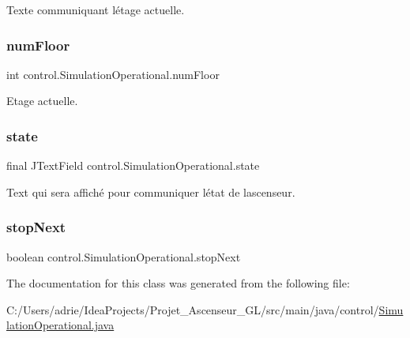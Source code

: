 Texte communiquant l\textquotesingle{}étage actuelle. 

\mbox{\label{classcontrol_1_1_simulation_operational_a8b244e8cd89afb3060e4025c76f3ccc1}} 
\subsubsection{\texorpdfstring{numFloor}{numFloor}}
{\footnotesize\ttfamily int control.\+Simulation\+Operational.\+num\+Floor\hspace{0.3cm}{\ttfamily [private]}}



Etage actuelle. 

\mbox{\label{classcontrol_1_1_simulation_operational_a00a11786ca7a99c8e6ee6b3990300ac6}} 
\subsubsection{\texorpdfstring{state}{state}}
{\footnotesize\ttfamily final J\+Text\+Field control.\+Simulation\+Operational.\+state\hspace{0.3cm}{\ttfamily [private]}}



Text qui sera affiché pour communiquer l\textquotesingle{}état de l\textquotesingle{}ascenseur. 

\mbox{\label{classcontrol_1_1_simulation_operational_acda8346b0a85916ca536b13bcb704b33}} 
\subsubsection{\texorpdfstring{stopNext}{stopNext}}
{\footnotesize\ttfamily boolean control.\+Simulation\+Operational.\+stop\+Next\hspace{0.3cm}{\ttfamily [private]}}



The documentation for this class was generated from the following file\+:\begin{DoxyCompactItemize}
\item 
C\+:/\+Users/adrie/\+Idea\+Projects/\+Projet\+\_\+\+Ascenseur\+\_\+\+G\+L/src/main/java/control/\mbox{\hyperlink{_simulation_operational_8java}{Simulation\+Operational.\+java}}\end{DoxyCompactItemize}
